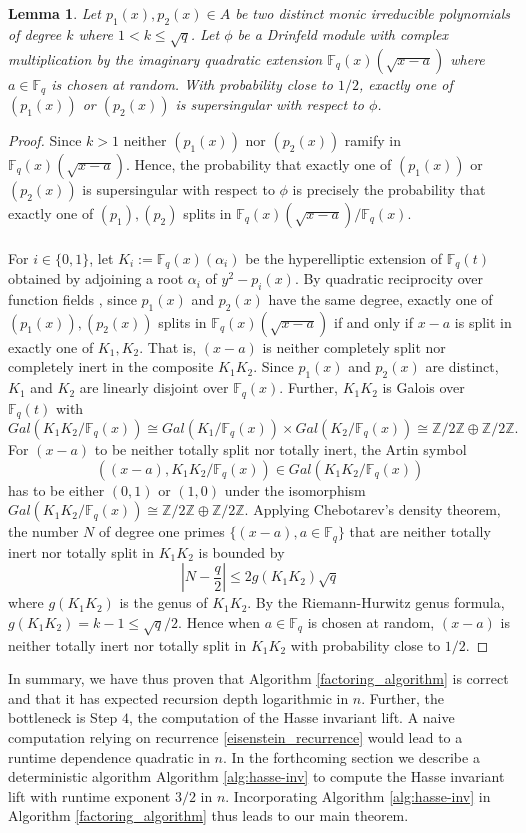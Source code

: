 \documentclass{article}
\theoremstyle{plain}
\newtheorem{lemma}[theorem]{Lemma}
\theoremstyle{definition}
\def\Z{\ensuremath{\mathbb{Z}}}
\def\F{\ensuremath{\mathbb{F}}}
\begin{document}
\begin{lemma}\label{splitting_lemma}
Let $p_1(x),p_2(x) \in A $ be two distinct monic irreducible polynomials of degree $k$ where $1<k \leq \sqrt{q}$. Let $\phi$ be a Drinfeld module with complex multiplication by the imaginary quadratic extension $\F_q(x)(\sqrt{x-a})$ where $a \in \F_q$ is chosen at random. With probability close to $1/2$, exactly one of $(p_1(x))$ or $(p_2(x))$ is supersingular with respect to $\phi$.
\end{lemma}
\begin{proof}
Since $k > 1$ neither $(p_1(x))$ nor $(p_2(x))$ ramify in $\F_q(x)(\sqrt{x-a})$. Hence, the probability that exactly one of $(p_1(x))$ or $(p_2(x))$ is supersingular with respect to $\phi$ is precisely the probability that exactly one of $(p_1),(p_2)$ splits in $\F_q(x)(\sqrt{x-a})/\F_q(x)$.\\ \\
For $i\in\{0,1\}$, let $K_i:=\F_q(x)(\alpha_i)$ be the hyperelliptic extension of $\F_q(t)$ obtained by adjoining a root $\alpha_i$ of $y^2-p_i(x)$. By quadratic reciprocity over function fields \cite{car}, since $p_1(x)$ and $p_2(x)$ have the same degree, exactly one of $(p_1(x)),(p_2(x))$ splits in $\F_q(x)(\sqrt{x-a})$ if and only if $x-a$ is split in exactly one of $K_1,K_2$. That is, $(x-a)$ is neither completely split nor completely inert in the composite $K_1K_2$. Since $p_1(x)$ and $p_2(x)$ are distinct, $K_1$ and $K_2$ are linearly disjoint over $\F_q(x)$. Further, $K_1K_2$ is Galois over $\F_q(t)$ with $$Gal(K_1K_2/\F_q(x)) \cong Gal(K_1/\F_q(x)) \times Gal(K_2/\F_q(x)) \cong \Z/2\Z \oplus \Z/2\Z.$$  For $(x-a)$ to be neither totally split nor totally inert, the Artin symbol $$((x-a),K_1K_2/\F_q(x)) \in Gal(K_1K_2/\F_q(x))$$ has to be either $(0,1)$ or $(1,0)$ under the isomorphism $Gal(K_1K_2/\F_q(x)) \cong \Z/2\Z \oplus \Z/2\Z$. Applying Chebotarev's density theorem, the number $N$ of degree one primes $\{(x-a),a\in \F_q\}$ that are neither totally inert nor totally split in $K_1K_2$ is bounded by 
$$ \left|N - \frac{q}{2} \right| \leq 2 g(K_1K_2)\sqrt{q}$$
where $g(K_1K_2)$ is the genus of $K_1K_2$. By the Riemann-Hurwitz genus formula, $g(K_1K_2) = k-1 \leq \sqrt{q}/2$. Hence when $a \in \F_q$ is chosen at random, $(x-a)$ is neither totally inert nor totally split in $K_1K_2$ with probability close to $1/2$. 
\end{proof}
In summary, we have thus proven that Algorithm \ref{factoring_algorithm} is correct and that it has expected recursion depth logarithmic in $n$. Further, the bottleneck is Step $4$, the computation of the Hasse invariant lift. A naive computation relying on recurrence \ref{eisenstein_recurrence} would lead to a runtime dependence quadratic in $n$. In the forthcoming section we describe a deterministic algorithm Algorithm \ref{alg:hasse-inv} to compute the Hasse invariant lift with runtime exponent $3/2$ in $n$. Incorporating Algorithm \ref{alg:hasse-inv} in Algorithm  \ref{factoring_algorithm} thus leads to our main theorem.
\end{document}
